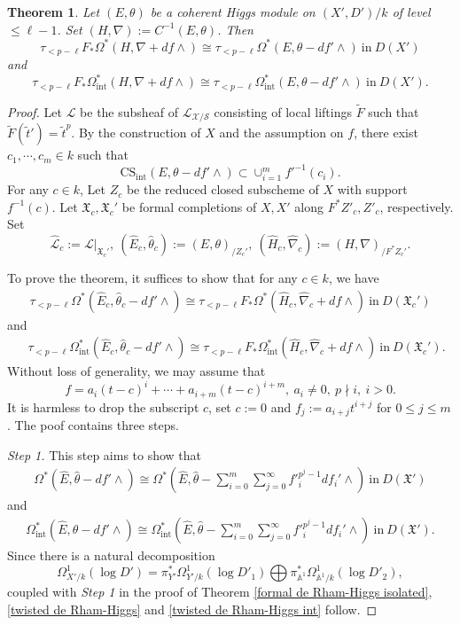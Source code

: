 \documentclass[12pt, a4paper]{article}
\newtheorem{theorem}{Theorem}[section]
\begin{document}
\begin{theorem}\label{twisted de Rham-Higgs thm}
Let $(E,\theta)$ be a coherent Higgs module on $(X',D')/k$ of level $\leq\ell-1$. Set $(H,\nabla):=C^{-1}(E,\theta)$. Then
$$
\tau_{<p-\ell}F_*\Omega^*(H,\nabla+df\wedge)\cong\tau_{<p-\ell}\Omega^*(E,\theta-df'\wedge)~\mathrm{in}~D(X')
$$
and
$$
\tau_{<p-\ell}F_*\Omega_\mathrm{int}^*(H,\nabla+df\wedge)\cong\tau_{<p-\ell}\Omega_\mathrm{int}^*(E,\theta-df'\wedge)~\mathrm{in}~D(X').
$$
\end{theorem}
\begin{proof}
 Let  $\mathcal L$ be the  subsheaf of $\mathcal L_{\mathcal X/\mathcal S}$ consisting of local liftings $\tilde F$ such that $\tilde F(\tilde t')=\tilde t^p$. By the construction of $X$ and the assumption on $f$, there exist $c_1,\cdots,c_m\in k$ such that 
 $$\mathrm{CS}_\mathrm{int}(E,\theta-df'\wedge)\subset\cup_{i=1}^mf'^{-1}(c_i).$$
 For any $c\in k$, Let $Z_c$ be the reduced closed subscheme of $X$ with support $ f^{-1}(c)$. Let $\mathfrak X_c,\mathfrak X_c'$ be formal completions of $X,X'$ along $F^*Z'_c,Z'_c$, respectively.
Set 
$$\hat{\mathcal L}_c:=\mathcal L|_{\mathfrak X_c'},~(\hat E_c,\hat\theta_c):=(E,\theta)_{/Z_c'},~(\hat H_c,\hat\nabla_c):=(H,\nabla)_{/F^*Z_c'}.$$

To prove the theorem, it suffices to show that for any $c\in k$, we have
\begin{eqnarray}\label{c}
\tau_{<p-\ell}\Omega^*(\hat E_c,\hat\theta_c-df'\wedge)\cong\tau_{<p-\ell}F_*\Omega^*(\hat H_c,\hat\nabla_c+df\wedge)~\mathrm{in}~D(\mathfrak X_c')
\end{eqnarray}
and
\begin{eqnarray}\label{c int}
\quad \tau_{<p-\ell}\Omega_\mathrm{int}^*(\hat E_c,\hat\theta_c-df'\wedge)\cong\tau_{<p-\ell}F_*\Omega_\mathrm{int}^*(\hat H_c,\hat\nabla_c+df\wedge)~\mathrm{in}~D(\mathfrak X_c').
\end{eqnarray}
 Without loss of generality, we may assume that 
$$
f=a_i(t-c)^i+\cdots+a_{i+m}(t-c)^{i+m},~a_i\neq0,~p\nmid i,~i>0.
$$
It is harmless to drop the subscript $c$, set $c:=0$ and $f_j:=a_{i+j}t^{i+j}$ for $0\leq j\leq m$. The poof contains three steps. 

{\itshape Step 1.} This step aims to show that
\begin{eqnarray}\label{twisted de Rham-Higgs}
\Omega^*(\hat E,\hat\theta-df'\wedge)\cong\Omega^*(\hat E,\hat\theta-\sum_{i=0}^m\sum_{j=0}^\infty f'^{p^j-1}_idf_i'\wedge)
~\mathrm{in}~D(\mathfrak X')
\end{eqnarray}
and
\begin{eqnarray}\label{twisted de Rham-Higgs int}
\Omega_\mathrm{int}^*(\hat E,\hat\theta-df'\wedge)\cong\Omega_\mathrm{int}^*(\hat E,\hat\theta-\sum_{i=0}^m\sum_{j=0}^\infty f'^{p^j-1}_idf_i'\wedge)
~\mathrm{in}~D(\mathfrak X').
\end{eqnarray}
Since there is a natural decomposition
$$
\Omega^1_{X'/k}(\log D')=\pi_{Y'}^*\Omega^1_{Y'/k}(\log D'_1)\bigoplus\pi^*_{\mathbb A^1}\Omega^1_{\mathbb A^1/k}(\log D'_2),
$$
coupled with {\itshape Step 1} in the proof of Theorem \ref{formal de Rham-Higgs isolated}, \eqref{twisted de Rham-Higgs} and \eqref{twisted de Rham-Higgs int} follow.


\end{proof}
\end{document}
